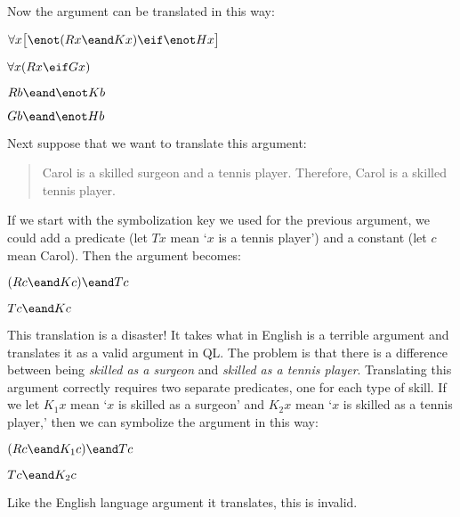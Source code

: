 Now the argument can be translated in this way:
\begin{earg}
\label{surgeon2}
\item[] $\forall x\bigl[\enot (Rx \eand Kx) \eif \enot Hx\bigr]$
\item[] $\forall x(Rx \eif Gx)$
\item[] $Rb \eand \enot Kb$
\item[\therefore] $Gb \eand \enot Hb$
\end{earg}


Next suppose that we want to translate this argument:
\begin{quote}
\label{surgeon3}
Carol is a skilled surgeon and a tennis player. Therefore, Carol is a skilled tennis player.
\end{quote}
If we start with the symbolization key we used for the previous argument, we could add a predicate (let $Tx$ mean `$x$ is a tennis player') and a constant (let $c$ mean Carol). Then the argument becomes:
\begin{earg}
\item[] $(Rc \eand Kc) \eand Tc$
\item[\therefore] $Tc \eand Kc$
\end{earg}
This translation is a disaster! It takes what in English is a terrible argument and translates it as a valid argument in QL. The problem is that there is a difference between being \emph{skilled as a surgeon} and \emph{skilled as a tennis player}. Translating this argument correctly requires two separate predicates, one for each type of skill. If we let $K_1x$ mean `$x$ is skilled as a surgeon' and $K_2x$ mean `$x$ is skilled as a tennis player,' then we can symbolize the argument in this way:
\begin{earg}
\label{surgeon3correct}
\item[] $(Rc \eand K_1c) \eand Tc$
\item[\therefore] $Tc \eand K_2c$
\end{earg}
Like the English language argument it translates, this is invalid. %

